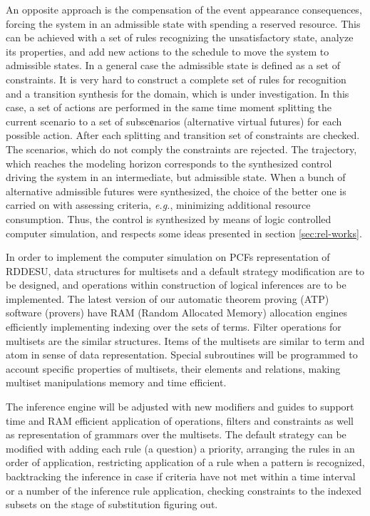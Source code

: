 \documentclass[runningheads]{llncs}
\begin{document}
An opposite approach is the compensation of the event appearance consequences, forcing the system in an admissible state with spending a reserved resource. This can be achieved with a set of rules recognizing the unsatisfactory state, analyze its properties, and add new actions to the schedule to move the system to admissible states. In a general case the admissible state is defined as a set of constraints. It is very hard to construct a complete set of rules for recognition and a transition synthesis for the domain, which is under investigation. In this case, a set of actions are performed in the same time moment splitting the current scenario to a set of subscеnarios (alternative virtual futures) for each possible action. After each splitting and transition set of constraints are checked. The scenarios, which do not comply the constraints are rejected. The trajectory, which reaches the modeling horizon corresponds to the synthesized control driving the system in an intermediate, but admissible state. When a bunch of alternative admissible futures were synthesized, the choice of the better one is carried on with assessing criteria, \emph{e.g.}, minimizing additional resource consumption. Thus, the control is synthesized by means of logic controlled computer simulation, and respects some ideas presented in section \ref{sec:rel-works}.

In order to implement the computer simulation on PCFs representation of RDDESU, data structures for multisets and a default strategy modification are to be designed, and operations within construction of logical inferences are to be implemented.  The latest version of our automatic theorem proving (ATP) software (provers) have RAM (Random Allocated Memory) allocation engines efficiently implementing indexing over the sets of terms. Filter operations for multisets are the similar structures. Items of the multisets are similar to term and atom in sense of data representation. Special subroutines will be programmed to account specific properties of multisets, their elements and relations, making multiset manipulations memory and time efficient.

The inference engine will be adjusted with new modifiers and guides to support time and RAM efficient application of operations, filters and constraints as well as representation of grammars over the multisets. The default strategy can be modified with adding each rule (a question) a priority, arranging the rules in an order of application, restricting application of a rule when a pattern is recognized, backtracking the inference in case if criteria have not met within a time interval or a number of the inference rule application, checking constraints to the indexed subsets on the stage of substitution figuring out.
\end{document}
